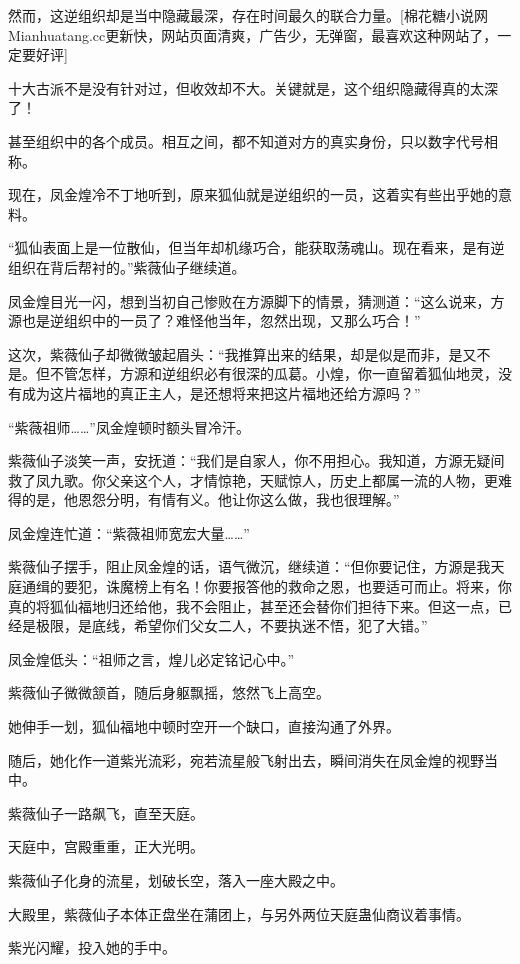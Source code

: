 \begin{this_body}
然而，这逆组织却是当中隐藏最深，存在时间最久的联合力量。[棉花糖小说网Mianhuatang.cc更新快，网站页面清爽，广告少，无弹窗，最喜欢这种网站了，一定要好评]

十大古派不是没有针对过，但收效却不大。关键就是，这个组织隐藏得真的太深了！

甚至组织中的各个成员。相互之间，都不知道对方的真实身份，只以数字代号相称。

现在，凤金煌冷不丁地听到，原来狐仙就是逆组织的一员，这着实有些出乎她的意料。

“狐仙表面上是一位散仙，但当年却机缘巧合，能获取荡魂山。现在看来，是有逆组织在背后帮衬的。”紫薇仙子继续道。

凤金煌目光一闪，想到当初自己惨败在方源脚下的情景，猜测道：“这么说来，方源也是逆组织中的一员了？难怪他当年，忽然出现，又那么巧合！”

这次，紫薇仙子却微微皱起眉头：“我推算出来的结果，却是似是而非，是又不是。但不管怎样，方源和逆组织必有很深的瓜葛。小煌，你一直留着狐仙地灵，没有成为这片福地的真正主人，是还想将来把这片福地还给方源吗？”

“紫薇祖师……”凤金煌顿时额头冒冷汗。

紫薇仙子淡笑一声，安抚道：“我们是自家人，你不用担心。我知道，方源无疑间救了凤九歌。你父亲这个人，才情惊艳，天赋惊人，历史上都属一流的人物，更难得的是，他恩怨分明，有情有义。他让你这么做，我也很理解。”

凤金煌连忙道：“紫薇祖师宽宏大量……”

紫薇仙子摆手，阻止凤金煌的话，语气微沉，继续道：“但你要记住，方源是我天庭通缉的要犯，诛魔榜上有名！你要报答他的救命之恩，也要适可而止。将来，你真的将狐仙福地归还给他，我不会阻止，甚至还会替你们担待下来。但这一点，已经是极限，是底线，希望你们父女二人，不要执迷不悟，犯了大错。”

凤金煌低头：“祖师之言，煌儿必定铭记心中。”

紫薇仙子微微颔首，随后身躯飘摇，悠然飞上高空。

她伸手一划，狐仙福地中顿时空开一个缺口，直接沟通了外界。

随后，她化作一道紫光流彩，宛若流星般飞射出去，瞬间消失在凤金煌的视野当中。

紫薇仙子一路飙飞，直至天庭。

天庭中，宫殿重重，正大光明。

紫薇仙子化身的流星，划破长空，落入一座大殿之中。

大殿里，紫薇仙子本体正盘坐在蒲团上，与另外两位天庭蛊仙商议着事情。

紫光闪耀，投入她的手中。


\end{this_body}
